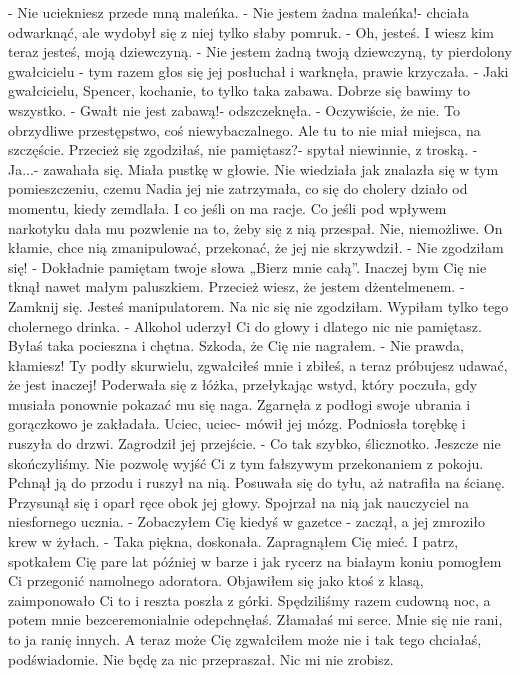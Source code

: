 \documentclass[12pt,a4paper]{book}
\begin{document}
- Nie uciekniesz przede mną maleńka. 
- Nie jestem żadna maleńka!- chciała odwarknąć, ale wydobył się z niej tylko słaby pomruk. 
- Oh, jesteś. I wiesz kim teraz jesteś, moją dziewczyną. 
- Nie jestem żadną twoją dziewczyną, ty pierdolony gwałcicielu - tym razem głos się jej posłuchał i warknęła, prawie krzyczała. 
- Jaki gwałcicielu, Spencer, kochanie, to tylko taka zabawa. Dobrze się bawimy to wszystko. 
- Gwałt nie jest zabawą!- odszczeknęła. 
- Oczywiście, że nie. To obrzydliwe przestępstwo, coś niewybaczalnego. Ale tu to nie miał miejsca, na szczęście. Przecież się zgodziłaś, nie pamiętasz?- spytał niewinnie, z troską. 
- Ja...- zawahała się. 
Miała pustkę w głowie. Nie wiedziała jak znalazła się w tym pomieszczeniu, czemu Nadia jej nie zatrzymała, co się do cholery działo od momentu, kiedy zemdlała. I co jeśli on ma racje. Co jeśli pod wpływem narkotyku dała mu pozwlenie na to, żeby się z nią przespał. Nie, niemożliwe. On kłamie, chce nią zmanipulować, przekonać, że jej nie skrzywdził. 
- Nie zgodziłam się!
- Dokładnie pamiętam twoje słowa „Bierz mnie całą”. Inaczej bym Cię nie tknął nawet małym paluszkiem. Przecież wiesz, że jestem dżentelmenem.
- Zamknij się. Jesteś manipulatorem. Na nic się nie zgodziłam. Wypiłam tylko tego cholernego drinka. 
- Alkohol uderzył Ci do głowy i dlatego nic nie pamiętasz. Byłaś taka pocieszna i chętna. Szkoda, że Cię nie nagrałem. 
- Nie prawda, kłamiesz! Ty podły skurwielu, zgwałciłeś mnie i zbiłeś, a teraz próbujesz udawać, że jest inaczej!
Poderwała się z łóżka, przełykając wstyd, który poczuła, gdy musiała ponownie pokazać mu się naga. Zgarnęła z podłogi swoje ubrania i gorączkowo je zakładała. Uciec, uciec- mówił jej mózg. Podniosła torębkę i ruszyła do drzwi. Zagrodził jej przejście. 
- Co tak szybko, ślicznotko. Jeszcze nie skończyliśmy. Nie pozwolę wyjść Ci z tym fałszywym przekonaniem z pokoju. 
Pchnął ją do przodu i ruszył na nią. Posuwała się do tyłu, aż natrafiła na ścianę. Przysunął się i oparł ręce obok jej głowy. Spojrzał na nią jak nauczyciel na niesfornego ucznia.
- Zobaczyłem Cię kiedyś w gazetce - zaczął, a jej zmroziło krew w żyłach. - Taka piękna, doskonała. Zapragnąłem Cię mieć. I patrz, spotkałem Cię pare lat później w barze i jak rycerz na białaym koniu pomogłem Ci przegonić namolnego adoratora. Objawiłem się jako ktoś z klasą, zaimponowało Ci to i reszta poszła z górki. Spędziliśmy razem cudowną noc, a potem mnie bezceremonialnie odepchnęłaś. Złamałaś mi serce. Mnie się nie rani, to ja ranię innych. A teraz może Cię zgwałciłem może nie i tak tego chciałaś, podświadomie. Nie będę za nic przepraszał. Nic mi nie zrobisz. 
\end{document}
